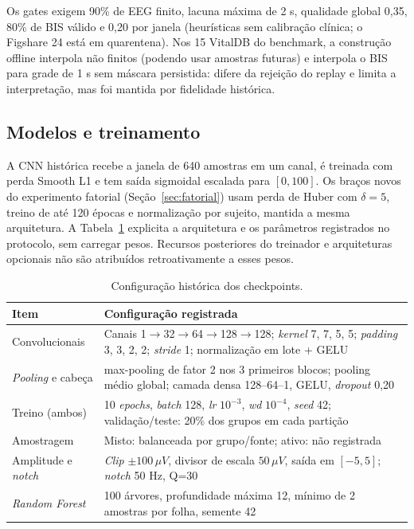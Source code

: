 \documentclass[12pt]{article}
\begin{document}
Os gates exigem 90\% de EEG finito, lacuna máxima de 2 s, qualidade global 0,35, 80\% de BIS válido e 0,20 por janela (heurísticas sem calibração clínica; o Figshare 24 está em quarentena). Nos 15 VitalDB do benchmark, a construção offline interpola não finitos (podendo usar amostras futuras) e interpola o BIS para grade de 1 s sem máscara persistida: difere da rejeição do replay e limita a interpretação, mas foi mantida por fidelidade histórica.

\subsection{Modelos e treinamento}

A CNN histórica recebe a janela de 640 amostras em um canal, é treinada com perda Smooth L1 e tem saída sigmoidal escalada para $[0,100]$. Os braços novos do experimento fatorial (Seção~\ref{sec:fatorial}) usam perda de Huber com $\delta=5$, treino de até 120 épocas e normalização por sujeito, mantida a mesma arquitetura. A Tabela~\ref{tab:config} explicita a arquitetura e os parâmetros registrados no protocolo, sem carregar pesos. Recursos posteriores do treinador e arquiteturas opcionais não são atribuídos retroativamente a esses pesos.

\begin{table}[H]
\centering
\footnotesize
\begin{tabular}{p{}p{}}
\hline
Item & Configuração registrada\\
\hline
Convolucionais & Canais 1$\to$32$\to$64$\to$128$\to$128; \textit{kernel} 7, 7, 5, 5; \textit{padding} 3, 3, 2, 2; \textit{stride} 1; normalização em lote + GELU\\
\textit{Pooling} e cabeça & max-pooling de fator 2 nos 3 primeiros blocos; pooling médio global; camada densa 128--64--1, GELU, \textit{dropout} 0,20\\
Treino (ambos) & 10 \textit{epochs}, \textit{batch} 128, \textit{lr} $10^{-3}$, \textit{wd} $10^{-4}$, \textit{seed} 42; validação/teste: 20\% dos grupos em cada partição\\
Amostragem & Misto: balanceada por grupo/fonte; ativo: não registrada\\
Amplitude e \textit{notch} & \textit{Clip} $\pm100\,\mu V$, divisor de escala $50\,\mu V$, saída em $[-5,5]$; \textit{notch} 50 Hz, Q=30\\
\textit{Random Forest} & 100 árvores, profundidade máxima 12, mínimo de 2 amostras por folha, semente 42\\
\hline
\end{tabular}
\caption{Configuração histórica dos checkpoints.}
\label{tab:config}
\end{table}
\end{document}
